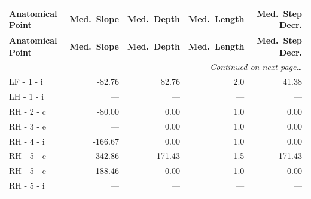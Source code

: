 \documentclass[a4paper,11pt]{article}
\begin{document}
\begin{small}
\begin{longtable}{p{4.5cm}rrrr}
\toprule
\textbf{Anatomical Point} &
\textbf{Med.\ Slope} &
\textbf{Med.\ Depth} &
\textbf{Med.\ Length} &
\textbf{Med.\ Step Decr.} \\
\midrule
\endfirsthead
\toprule
\textbf{Anatomical Point} &
\textbf{Med.\ Slope} &
\textbf{Med.\ Depth} &
\textbf{Med.\ Length} &
\textbf{Med.\ Step Decr.} \\
\midrule
\endhead
\midrule
\multicolumn{5}{r}{\small\emph{Continued on next page\ldots}} \\
\endfoot
\bottomrule
\endlastfoot
LF - 1 - i & -82.76 & 82.76 & 2.0 & 41.38 \\
LH - 1 - i & --- & --- & --- & --- \\
RH - 2 - c & -80.00 & 0.00 & 1.0 & 0.00 \\
RH - 3 - e & --- & 0.00 & 1.0 & 0.00 \\
RH - 4 - i & -166.67 & 0.00 & 1.0 & 0.00 \\
RH - 5 - c & -342.86 & 171.43 & 1.5 & 171.43 \\
RH - 5 - e & -188.46 & 0.00 & 1.0 & 0.00 \\
RH - 5 - i & --- & --- & --- & --- \\
\end{longtable}
\end{small}
\end{document}
